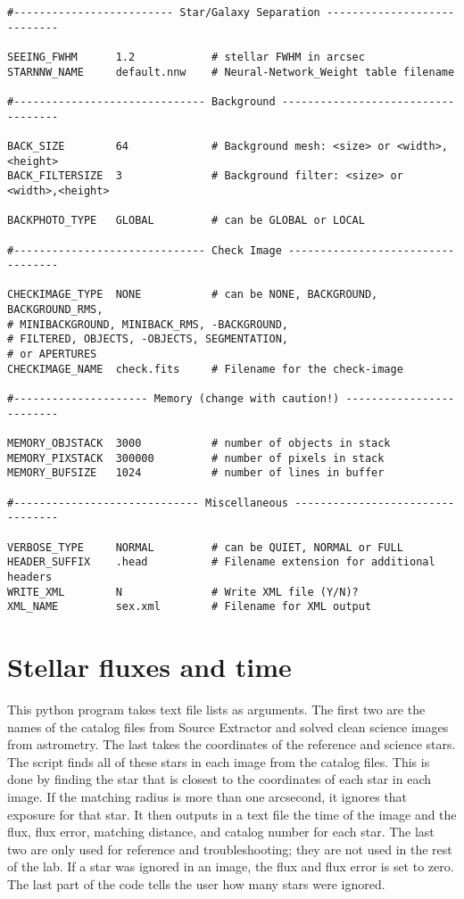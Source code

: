\documentclass{aastex}
\begin{document}
\begin{lstlisting}[caption = Configuration file for Source Extractor (YM)]
#------------------------- Star/Galaxy Separation ----------------------------

SEEING_FWHM      1.2            # stellar FWHM in arcsec
STARNNW_NAME     default.nnw    # Neural-Network_Weight table filename

#------------------------------ Background -----------------------------------

BACK_SIZE        64             # Background mesh: <size> or <width>,<height>
BACK_FILTERSIZE  3              # Background filter: <size> or <width>,<height>

BACKPHOTO_TYPE   GLOBAL         # can be GLOBAL or LOCAL

#------------------------------ Check Image ----------------------------------

CHECKIMAGE_TYPE  NONE           # can be NONE, BACKGROUND, BACKGROUND_RMS,
# MINIBACKGROUND, MINIBACK_RMS, -BACKGROUND,
# FILTERED, OBJECTS, -OBJECTS, SEGMENTATION,
# or APERTURES
CHECKIMAGE_NAME  check.fits     # Filename for the check-image

#--------------------- Memory (change with caution!) -------------------------

MEMORY_OBJSTACK  3000           # number of objects in stack
MEMORY_PIXSTACK  300000         # number of pixels in stack
MEMORY_BUFSIZE   1024           # number of lines in buffer

#----------------------------- Miscellaneous ---------------------------------

VERBOSE_TYPE     NORMAL         # can be QUIET, NORMAL or FULL
HEADER_SUFFIX    .head          # Filename extension for additional headers
WRITE_XML        N              # Write XML file (Y/N)?
XML_NAME         sex.xml        # Filename for XML output                                      
\end{lstlisting}

\appendix
\section{Stellar fluxes and time} \label{code: flux}
This python program takes text file lists as arguments. The first two are the names of the catalog files from Source Extractor and solved clean science images from astrometry. The last takes the coordinates of the reference and science stars. The script finds all of these stars in each image from the catalog files. This is done by finding the star that is closest to the coordinates of each star in each image. If the matching radius is more than one arcsecond, it ignores that exposure for that star. It then outputs in a text file the time of the image and the flux, flux error, matching distance, and catalog number for each star. The last two are only used for reference and troubleshooting; they are not used in the rest of the lab. If a star was ignored in an image, the flux and flux error is set to zero. The last part of the code tells the user how many stars were ignored. 
\end{document}
